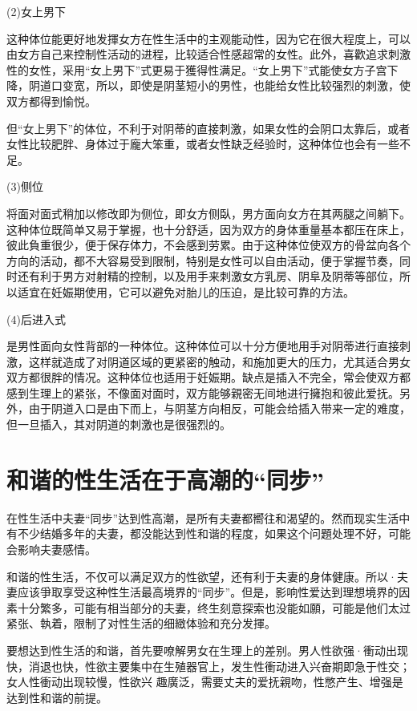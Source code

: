 \documentclass[12pt,UTF8]{ctexbook}
\begin{document}
(2)女上男下

这种体位能更好地发揮女方在性生活中的主观能动性，因为它在很大程度上，可以由女方自己来控制性活动的进程，比较适合性感超常的女性。此外，喜歡追求刺激性的女性，采用“女上男下”式更易于獲得性满足。“女上男下”式能使女方子宫下降，阴道口变宽，所以，即使是阴茎短小的男性，也能给女性比较强烈的刺激，使双方都得到愉悦。

但“女上男下”的体位，不利于对阴蒂的直接刺激，如果女性的会阴口太靠后，或者女性比较肥胖、身体过于龐大笨重，或者女性缺乏经验时，这种体位也会有一些不足。

(3)侧位

将面对面式稍加以修改即为侧位，即女方侧臥，男方面向女方在其两腿之间躺下。这种体位既简单又易于掌握，也十分舒适，因为双方的身体重量基本都压在床上，彼此負重很少，便于保存体力，不会感到劳累。由于这种体位使双方的骨盆向各个方向的活动，都不大容易受到限制，特别是女性可以自由活动，便于掌握节奏，同时还有利于男方对射精的控制，以及用手来刺激女方乳房、阴阜及阴蒂等部位，所以适宜在妊娠期使用，它可以避免对胎儿的压迫，是比较可靠的方法。

(4)后进入式

是男性面向女性背部的一种体位。这种体位可以十分方便地用手对阴蒂进行直接刺激，这样就造成了对阴道区域的更紧密的触动，和施加更大的压力，尤其适合男女双方都很胖的情况。这种体位也适用于妊娠期。缺点是插入不完全，常会使双方都感到生理上的紧张，不像面对面时，双方能够親密无间地进行擁抱和彼此爱抚。另外，由于阴道入口是由下而上，与阴茎方向相反，可能会给插入带来一定的难度，但一旦插入，其对阴道的刺激也是很强烈的。

\section{和谐的性生活在于高潮的“同步”}

在性生活中夫妻“同步”达到性高潮，是所有夫妻都嚮往和渴望的。然而现实生活中有不少结婚多年的夫妻，都没能达到性和谐的程度，如果这个问題处理不好，可能会影响夫妻感情。

和谐的性生活，不仅可以满足双方的性欲望，还有利于夫妻的身体健康。所以·夫妻应该爭取享受这种性生活最高境界的“同步”。但是，影响性爱达到理想境界的因素十分繁多，可能有相当部分的夫妻，终生刻意探索也没能如願，可能是他们太过紧张、執着，限制了对性生活的细緻体验和充分发揮。

要想达到性生活的和谐，首先要嘹解男女在生理上的差别。男人性欲强·衝动出现快，消退也快，性欲主要集中在生殖器官上，发生性衝动进入兴奋期即急于性交；女人性衝动出现较慢，性欲兴
趣廣泛，需要丈夫的爱抚親吻，性憋产生、增强是达到性和谐的前提。
\end{document}

